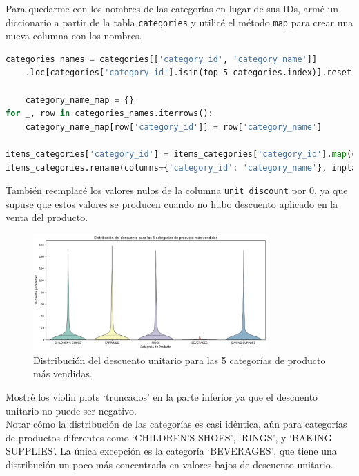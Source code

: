 Para quedarme con los nombres de las categorías en lugar de sus IDs, armé un diccionario a partir de la tabla \texttt{categories} y utilicé el método \texttt{map} para crear una nueva columna con los nombres.

\begin{lstlisting}[language=Python, xleftmargin=35pt, xrightmargin=35pt]
categories_names = categories[['category_id', 'category_name']]
    .loc[categories['category_id'].isin(top_5_categories.index)].reset_index()

    category_name_map = {}
for _, row in categories_names.iterrows():
    category_name_map[row['category_id']] = row['category_name']

items_categories['category_id'] = items_categories['category_id'].map(category_name_map)
items_categories.rename(columns={'category_id': 'category_name'}, inplace=True)
\end{lstlisting}

También reemplacé los valores nulos de la columna \texttt{unit\_discount} por 0, ya que supuse que estos valores se producen cuando no hubo descuento aplicado en la venta del producto.

\begin{figure}[H]
    \centering
    \includegraphics[width=0.8\textwidth]{imagenes/consultas_propias/descuento_categorias.png}
    \caption{Distribución del descuento unitario para las 5 categorías de producto más vendidas.}
    \label{fig:descuento_categorias}
\end{figure}

Mostré los violin plots `truncados' en la parte inferior ya que el descuento unitario no puede ser negativo. \\
Notar cómo la distribución de las categorías es casi idéntica, aún para categorías de productos diferentes como `CHILDREN'S SHOES', `RINGS', y `BAKING SUPPLIES'. La única excepción es la categoría `BEVERAGES', que tiene una distribución un poco más concentrada en valores bajos de descuento unitario.

